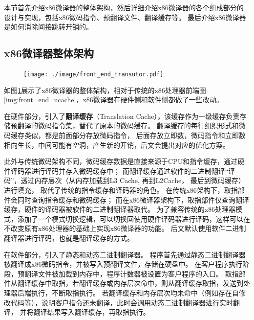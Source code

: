 
本节首先介绍x86微译器的整体架构，然后详细介绍x86微译器的各个组成部分的设计与实现，包括x86微码指令、预翻译文件、翻译缓存等。
最后介绍x86微译器是如何消除间接跳转开销的。

\subsection{x86微译器整体架构}

\begin{figure}[!htbp]
  \centering
  \texttt{[image: ./image/front\_end\_transutor.pdf]}
  \label{img:front_end_transutor}
\end{figure}

如图\ref{img:front_end_transutor}展示了x86微译器的整体架构，相对于传统的x86处理器前端图\ref{img:front_end_ucache}，x86微译器在硬件侧和软件侧都做了一些改动。


在硬件部分，引入了\textbf{翻译缓存}（Translation Cache），该缓存作为一级缓存负责存储预翻译的微码指令集，替代了原本的微码缓存。
翻译缓存的每行组织形式和微码缓存类似，都是前面部分存放微码指令，
后面存放立即数，微码指令和立即数相向生长，中间可能有空洞，产生新的开销，后文会提出对应的优化方案。

此外与传统微码架构不同，微码缓存数据是直接来源于CPU和指令缓存，通过硬件译码器进行译码并存入微码缓存中；
而翻译缓存通过软件的二进制翻译“译码”，透过内存层次（从内存加载到L3 Cache, 再到L2Cache， 最后到微码缓存）进行填充，
取代了传统的指令缓存和译码器的角色。
在传统x86架构下，取指部件会同时查询指令缓存和微码缓存；
而在x86微译器架构下，取指部件仅查询翻译缓存，硬件的译码器被软件的二进制翻译器取代。
为了兼容传统的x86处理器模式，添加了一个模式切换逻辑，可以切换回使用硬件译码器进行译码，这样可以在不改变原有x86处理器的基础上实现x86微译器的功能。
后文默认使用软件二进制翻译器进行译码，也就是翻译缓存的方式。

在软件部分，引入了静态和动态二进制翻译器。
程序首先通过静态二进制翻译器被翻译成x86微码指令，并被写入预翻译文件，存储在硬盘中。
在客户程序执行阶段，预翻译文件被加载到内存中，程序计数器被设置为客户程序的入口。
取指部件从翻译缓存中取指，若翻译缓存或内存层次命中，则从翻译缓存取指，发送到处理器后端执行，不断取指执行。
若翻译缓存和内存层次均未命中（例如存在自修改代码等），说明客户指令还未翻译，此时会调用动态二进制翻译器进行实时翻译，
并将翻译结果写入翻译缓存，再取指执行。

